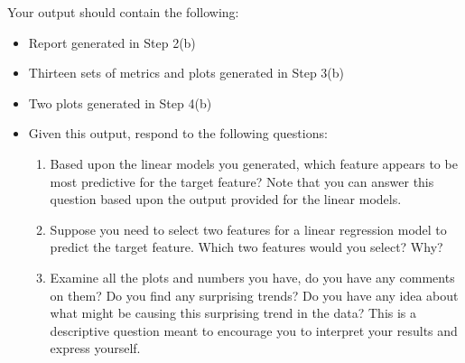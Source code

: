 \documentclass[letter-paper,12pt]{article} %
\begin{document}
Your output should contain the following:
\begin{itemize}
    \item Report generated in Step 2(b)
    \item Thirteen sets of metrics and plots  generated in Step 3(b)
    \item  Two plots generated in Step 4(b) 
	\item Given this output, respond to the following questions:
			\begin{enumerate}
    			\item Based upon the linear models you generated, which feature appears to be most predictive for the target feature? Note that you can answer this question based upon the output provided for the linear models.

    			\item Suppose you need to select two features for a linear regression model to predict the target feature. Which two features would you select? Why?
    
    			\item Examine all the plots and numbers you have, do you have any comments on them? Do you find any surprising trends? Do you have any idea about what might be causing this surprising trend in the data? This is a descriptive question meant to encourage you to interpret your results and express yourself. 
        
\end{enumerate}
\end{itemize}
\end{document}
